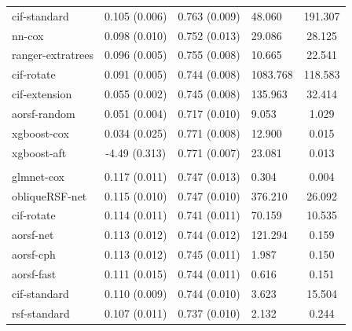 \documentclass[twoside,11pt]{article}\usepackage[]{graphicx}\usepackage[]{xcolor}
\newenvironment{knitrout}{}{} %
\begin{document}
\begin{knitrout}
\begin{longtable}[t]{lcclc}
\hspace{1em}cif-standard & 0.105 (0.006) & 0.763 (0.009) & 48.060 & 191.307\\
\hspace{1em}nn-cox & 0.098 (0.010) & 0.752 (0.013) & 29.086 & 28.125\\
\hspace{1em}ranger-extratrees & 0.096 (0.005) & 0.755 (0.008) & 10.665 & 22.541\\
\hspace{1em}cif-rotate & 0.091 (0.005) & 0.744 (0.008) & 1083.768 & 118.583\\
\hspace{1em}cif-extension & 0.055 (0.002) & 0.745 (0.008) & 135.963 & 32.414\\
\hspace{1em}aorsf-random & 0.051 (0.004) & 0.717 (0.010) & 9.053 & 1.029\\
\hspace{1em}xgboost-cox & 0.034 (0.025) & 0.771 (0.008) & 12.900 & 0.015\\
\hspace{1em}xgboost-aft & -4.49 (0.313) & 0.771 (0.007) & 23.081 & 0.013\\
\addlinespace[0.3em]
\hline
\multicolumn{5}{l}{\textit{\textbf{Systolic Heart Failure; death, n = 2231, p = 41}}}\\
\hline
\hspace{1em}glmnet-cox & 0.117 (0.011) & 0.747 (0.013) & 0.304 & 0.004\\
\hspace{1em}obliqueRSF-net & 0.115 (0.010) & 0.747 (0.010) & 376.210 & 26.092\\
\hspace{1em}cif-rotate & 0.114 (0.011) & 0.741 (0.011) & 70.159 & 10.535\\
\hspace{1em}aorsf-net & 0.113 (0.012) & 0.744 (0.012) & 121.294 & 0.159\\
\hspace{1em}aorsf-cph & 0.113 (0.012) & 0.745 (0.011) & 1.987 & 0.150\\
\hspace{1em}aorsf-fast & 0.111 (0.015) & 0.744 (0.011) & 0.616 & 0.151\\
\hspace{1em}cif-standard & 0.110 (0.009) & 0.744 (0.010) & 3.623 & 15.504\\
\hspace{1em}rsf-standard & 0.107 (0.011) & 0.737 (0.010) & 2.132 & 0.244\\

\end{longtable}
\end{knitrout}
\end{document}
